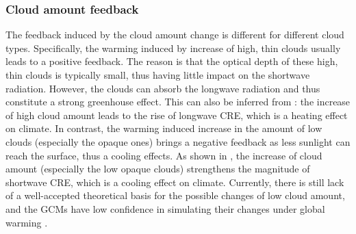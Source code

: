 \subsubsection{Cloud amount feedback}
The feedback induced by the cloud amount change is different for different cloud types. Specifically, the warming induced
by increase of high, thin clouds usually leads to a positive feedback. The reason is that the optical depth of these high,
thin clouds is typically small, thus having little impact on the shortwave radiation. However, the clouds can absorb the longwave radiation and thus constitute a strong greenhouse effect. This can also be inferred from : the increase of high cloud amount leads to the rise of longwave CRE, which is a heating effect on climate. In contrast, the warming induced increase in the amount of low clouds (especially the opaque ones) brings a negative feedback as less sunlight can reach the surface, thus a cooling effects. As shown in , the increase of cloud amount (especially the low opaque clouds) strengthens the magnitude of shortwave CRE, which is a cooling effect on climate. Currently, there is still lack of a well-accepted theoretical basis for the possible changes of low cloud amount, and the GCMs have low confidence in simulating their changes under global warming \citep{Stocker2013}.


